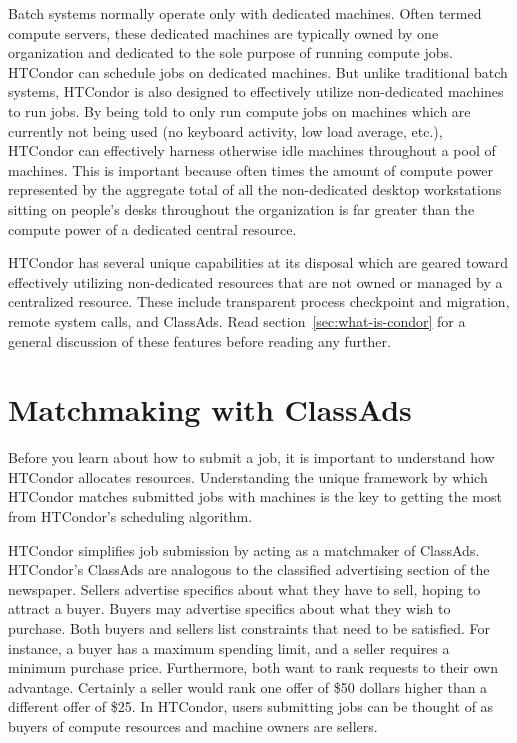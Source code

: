 Batch systems normally operate only with dedicated machines.  Often 
termed compute servers, these dedicated machines are typically owned by
one organization and dedicated to the sole purpose of running compute
jobs.  HTCondor can schedule jobs on dedicated machines.  But unlike traditional 
batch systems, HTCondor is also designed to effectively 
utilize non-dedicated machines to run jobs.  By being told to only
run compute jobs on machines which are currently not being used (no keyboard
activity, low load average, etc.), HTCondor can
effectively harness otherwise idle machines throughout a pool of machines.
This is important because often times the amount of
compute power represented by the aggregate total of all the non-dedicated 
desktop workstations sitting on people's desks throughout the
organization is far greater than the compute power of a dedicated
central resource.

HTCondor has several unique capabilities at its disposal which are geared 
toward effectively utilizing non-dedicated resources that are not owned or
managed by a centralized resource. These include transparent process
checkpoint and migration, remote system calls, and ClassAds.
Read section~\ref{sec:what-is-condor} for a general 
discussion of these features before reading any further.


\section{Matchmaking with ClassAds}
\label{sec:matchmaking-with-classads}

Before you learn about how to submit a job, it is important to
understand how HTCondor allocates resources. 
Understanding the
unique framework by which HTCondor matches submitted jobs with machines is
the key to getting the most from HTCondor's scheduling algorithm. 

HTCondor simplifies job submission by acting as a matchmaker of ClassAds.
HTCondor's ClassAds
are analogous to the classified advertising section of the
newspaper. Sellers advertise specifics about what they have to sell,
hoping to attract a buyer. Buyers may advertise specifics about what
they wish to purchase. Both buyers and sellers list constraints that
need to be satisfied.
For instance, a buyer has a maximum spending limit, 
and a seller requires a minimum purchase price.
Furthermore, both want to rank requests to their own advantage.
Certainly a seller would rank
one offer of \$50 dollars higher than a different
offer of \$25.
In HTCondor, users submitting
jobs can be thought of as buyers of compute resources and machine owners
are sellers. 

